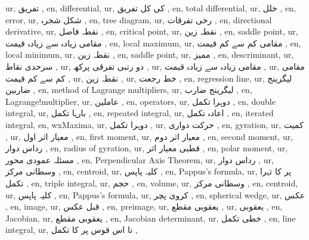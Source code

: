 ur, تفریق ,
en, differential,
ur,   کی کل تفریق ,
en, total differential,
ur, خلل ,
en, error,
ur, شکل شجرہ ,
en, tree diagram,
ur, رخی تفرقات ,
en, directional derivative,
ur,  نقطہ فاصل ,
en, critical point,
ur,  نقطہ زین ,
en, saddle point,
ur,  مقامی زیادہ سے زیادہ قیمت ,
en, local maximum,
ur,  مقامی کم سے کم قیمت ,
en, local minimum,
ur, نقطہ زین ,
en, saddle point,
ur, ممیز ,
en, descriminant,
ur, سرحدی نقاط ,
ur, دو رتبی تفرقی پرکھ ,
ur,  مقامی زیادہ سے زیادہ قیمت ,
ur, مقامی کم سے کم قیمت ,
ur, نقطہ زین ,
ur, خط رجعت ,
en, regression line,
ur, لیگرینج ضاربین ,
en, method of Lagrange multipliers,
ur, لیگرینج ضارب ,
en, Lagrange!multiplier,
ur,  عاملین ,
en, operators,
ur, دوہرا تکمل ,
en, double integral,
ur, بارہا تکمل ,
en, repeated integral,
ur, اعادہ تکمل ,
en, iterated integral,
en, wxMaxima,
ur,  دوہرا تکمل ,
ur, حرکت دواری ,
en, gyration,
ur, کمیت ,
ur, معیار اثر اول ,
en, first moment,
ur,  معیار اثر دوم ,
en, second moment,
ur,  رداس دوار ,
en, radius of gyration,
ur, قطبی معیار اثر ,
en, polar moment,
ur, مسئلہ عمودی محور ,
en, Perpendicular Axis Theorem,
ur, رداس دوار ,
ur, وسطانی مرکز ,
en, centroid,
ur, کلیہ پاپس ,
en, Pappus's formula,
ur,   پر  کا تہرا تکمل ,
en, triple integral,
ur, حجم ,
en, volume,
ur, وسطانی مرکز ,
en, centroid,
ur, کلیہ پاپس ,
en, Pappus's formula,
ur, کروی پچر ,
en, spherical wedge,
ur, عکس ,
en, image,
ur, قبل عکس ,
en, preimage,
ur, یعقوبی مقطع ,
ur, یعقوبی ,
en, Jacobian,
ur, یعقوبی مقطع ,
en, Jacobian determinant,
ur, خطی تکمل ,
en, line integral,
ur,   تا  اس قوس پر  کا تکمل ,

